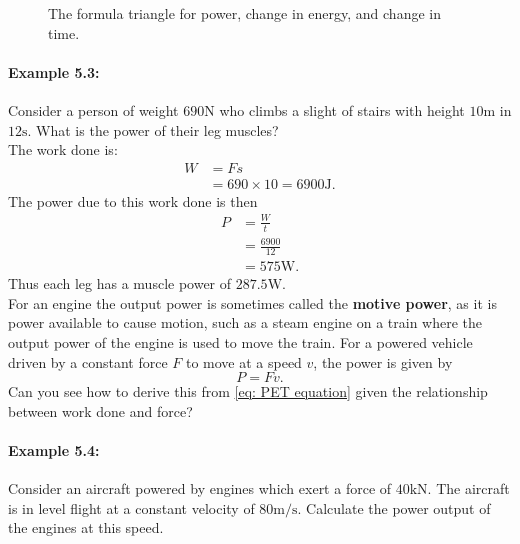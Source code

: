 \documentclass[a4paper,12pt]{book}
\begin{document}
\begin{figure}[ht]
    \centering
    \large {}
    \caption{The formula triangle for power, change in energy, and change in time. }
    \label{fig: PEt triangle}
\end{figure}

\paragraph{Example 5.3:} Consider a person of weight $690\text{N}$ who climbs a slight of stairs with height $10\text{m}$ in $12\text{s}$.  What is the power of their leg muscles?\\

The work done is:
\begin{align*}
W	&=Fs\\
	&=690\times 10=6900 \text{J}.
\end{align*}
The power due to this work done is then
\begin{align*}
P&=\frac{W}{t}\\
	&=\frac{6900}{12}\\
	&=575\text{W}.
\end{align*}
Thus each leg has a muscle power of $287.5\text{W}$.\\

For an engine the output power is sometimes called the \textbf{motive power}, as it is power available to cause motion, such as a steam engine on a train where the output power of the engine is used to move the train. For a powered vehicle driven by a constant force $F$ to move at a speed $v$, the power is given by
\begin{equation*}
P=Fv.
\end{equation*}
Can you see how to derive this from \cref{eq: PET equation} given the relationship between work done and force?

\paragraph{Example 5.4:} Consider an aircraft powered by engines which exert a force of $40\text{kN}$. The aircraft is in level flight at a constant velocity of $80\text{m/s}$. Calculate the power output of the engines at this speed.\\
\end{document}
